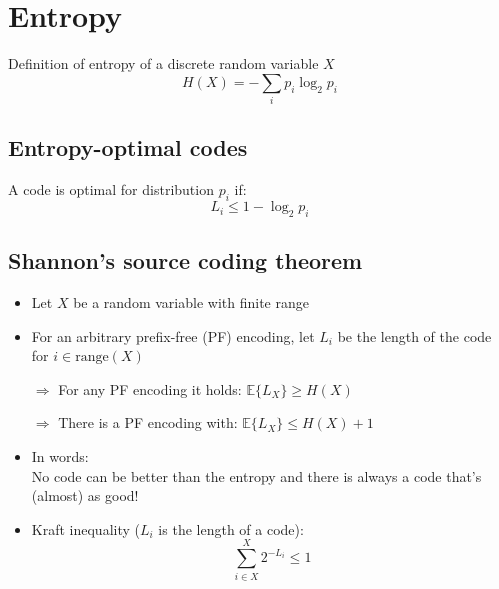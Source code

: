 \documentclass[a4paper]{scrartcl}
\newcommand{\blu}[1]{\textcolor{mainblue}{#1}}
\begin{document}
\section{Entropy}
\label{sec:entropy}
Definition of entropy of a discrete random variable $X$
\[H(X) = -\sum_i p_i \log_2 p_i\]

\subsection{Entropy-optimal codes}
\label{sec:entropy_optimal_codes}
A code is optimal for distribution $p_i$ if:
\[L_i\le 1 - \log_2 p_i\]
\subsection{Shannon's source coding theorem}
\label{sec:shannon_theorem}

\begin{itemize}
\item Let $X$ be a random variable with \blu{finite range}
\item For an arbitrary prefix-free (PF) encoding, let $L_i$ be the length of the
  code for $i \in \mathrm{range}(X)$
\item[$\Rightarrow$] For any PF encoding it holds: $\mathbb{E}\{L_X\}\ge H(X)$
\item[$\Rightarrow$] There is a PF encoding with: $\mathbb{E}\{L_X\}\le H(X) + 1$
\item In words:\\
  \blu{No code can be better than the entropy and there is always a code that's
    (almost) as good!}
\item Kraft inequality ($L_i$ is the length of a code):
\[\sum_{i\in X}^X 2^{-L_i}\le 1\]
\end{itemize}
\end{document}
